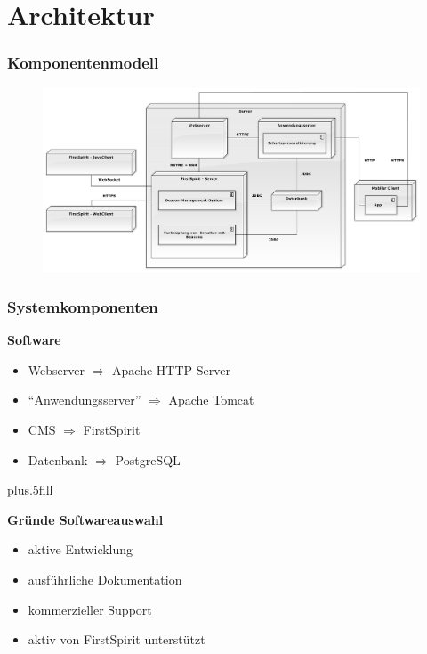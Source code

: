 \documentclass{beamer}
\begin{document}

\section{Architektur}

\begin{frame}
\frametitle<presentation>{Komponentenmodell}

\begin{figure}[!h]
\centering
\includegraphics[scale=0.3]{./Abbildungen/Deploymentdiagram2.png}
\end{figure}


\end{frame}

\begin{frame}
\frametitle<presentation>{Systemkomponenten}

\textbf{Software}

 \begin{itemize}
	  		\item Webserver $\Rightarrow$ Apache HTTP Server
	  		\item "`Anwendungsserver"' $\Rightarrow$ Apache Tomcat
	  		\item CMS $\Rightarrow$ FirstSpirit
	  		\item Datenbank $\Rightarrow$ PostgreSQL
		\end{itemize}
		
		\vskip0pt plus.5fill
		
		\textbf{Gründe Softwareauswahl}
		 \begin{itemize}
	  		\item aktive Entwicklung
	  		\item ausführliche Dokumentation
	  		\item kommerzieller Support
	  		\item aktiv von FirstSpirit unterstützt
		\end{itemize}

\end{frame}
\end{document}
